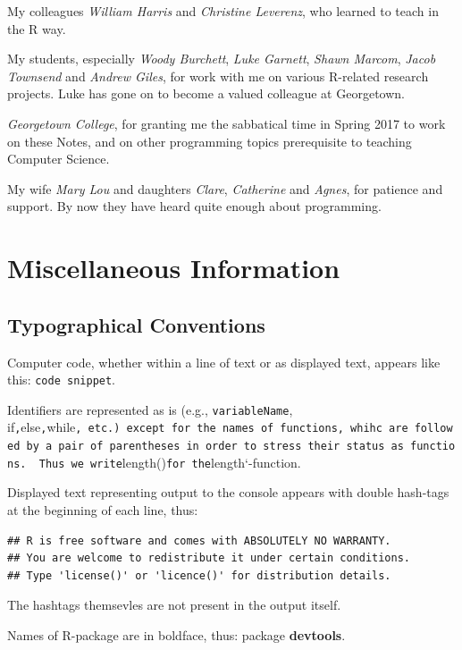 \documentclass[]{book}
\theoremstyle{definition}
\theoremstyle{definition}
\theoremstyle{definition}
\theoremstyle{remark}
\begin{document}
My colleagues \emph{William Harris} and \emph{Christine Leverenz}, who
learned to teach in the R way.

My students, especially \emph{Woody Burchett}, \emph{Luke Garnett},
\emph{Shawn Marcom}, \emph{Jacob Townsend} and \emph{Andrew Giles}, for
work with me on various R-related research projects. Luke has gone on to
become a valued colleague at Georgetown.

\emph{Georgetown College}, for granting me the sabbatical time in Spring
2017 to work on these Notes, and on other programming topics
prerequisite to teaching Computer Science.

My wife \emph{Mary Lou} and daughters \emph{Clare}, \emph{Catherine} and
\emph{Agnes}, for patience and support. By now they have heard quite
enough about programming.

\section{Miscellaneous Information}\label{miscellaneous-information}

\subsection{Typographical Conventions}\label{typographical-conventions}

Computer code, whether within a line of text or as displayed text,
appears like this: \texttt{code\ snippet}.

Identifiers are represented as is (e.g., \texttt{variableName},
if\texttt{,}else\texttt{,}while\texttt{,\ etc.)\ except\ for\ the\ names\ of\ functions,\ whihc\ are\ followed\ by\ a\ pair\ of\ parentheses\ in\ order\ to\ stress\ their\ status\ as\ functions.\ \ Thus\ we\ write}length()\texttt{for\ the}length`-function.

Displayed text representing output to the console appears with double
hash-tags at the beginning of each line, thus:

\begin{verbatim}
## R is free software and comes with ABSOLUTELY NO WARRANTY.
## You are welcome to redistribute it under certain conditions.
## Type 'license()' or 'licence()' for distribution details.
\end{verbatim}

The hashtags themsevles are not present in the output itself.

Names of R-package are in boldface, thus: package \textbf{devtools}.
\end{document}
